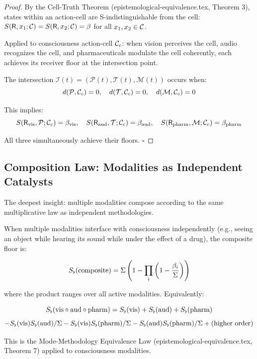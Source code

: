 \begin{proof}
By the Cell-Truth Theorem (epistemological-equivalence.tex, Theorem 3), states within an action-cell are S-indistinguishable from the cell: $S(\mathsf{R}, x_1; \mathcal{C}) = S(\mathsf{R}, x_2; \mathcal{C}) = \beta$ for all $x_1, x_2 \in \mathcal{C}$.

Applied to consciousness action-cell $\mathcal{C}_c$: when vision perceives the cell, audio recognizes the cell, and pharmaceuticals modulate the cell coherently, each achieves its receiver floor at the intersection point.

The intersection $\mathcal{I}(t) = (\mathcal{P}(t), \mathcal{T}(t), \mathcal{M}(t))$ occurs when:
$$d(\mathcal{P}, \mathcal{C}_c) = 0, \quad d(\mathcal{T}, \mathcal{C}_c) = 0, \quad d(\mathcal{M}, \mathcal{C}_c) = 0$$

This implies:
$$S(\mathsf{R}_{\text{vis}}, \mathcal{P}; \mathcal{C}_c) = \beta_{\text{vis}}, \quad S(\mathsf{R}_{\text{aud}}, \mathcal{T}; \mathcal{C}_c) = \beta_{\text{aud}}, \quad S(\mathsf{R}_{\text{pharm}}, \mathcal{M}; \mathcal{C}_c) = \beta_{\text{pharm}}$$

All three simultaneously achieve their floors. $\square$
\end{proof}

\subsection{Composition Law: Modalities as Independent Catalysts}

The deepest insight: multiple modalities compose according to the same multiplicative law as independent methodologies.

\begin{theorem}
\label{thm:modality-composition}
When multiple modalities interface with consciousness independently (e.g., seeing an object while hearing its sound while under the effect of a drug), the composite floor is:

$$S_{\flat}(\text{composite}) = \Sigma\left(1 - \prod_{i}\left(1-\frac{\beta_i}{\Sigma}\right)\right)$$

where the product ranges over all active modalities. Equivalently:

$$S_{\flat}(\text{vis} \circ \text{aud} \circ \text{pharm}) = S_{\flat}(\text{vis}) + S_{\flat}(\text{aud}) + S_{\flat}(\text{pharm})$$
$$- S_{\flat}(\text{vis})S_{\flat}(\text{aud})/\Sigma - S_{\flat}(\text{vis})S_{\flat}(\text{pharm})/\Sigma - S_{\flat}(\text{aud})S_{\flat}(\text{pharm})/\Sigma + \text{(higher order)}$$

This is the Mode-Methodology Equivalence Law (epistemological-equivalence.tex, Theorem 7) applied to consciousness modalities.
\end{theorem}

